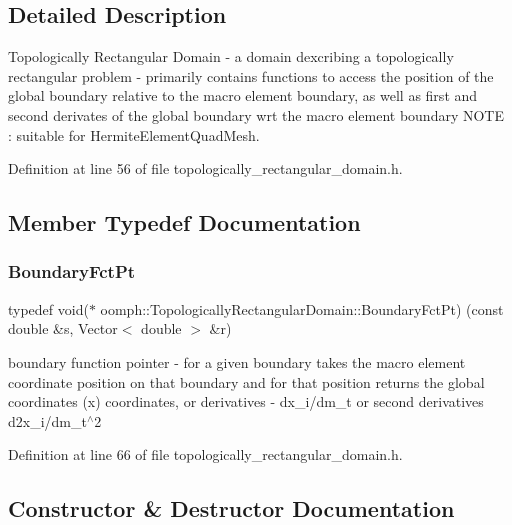 \subsection{Detailed Description}
Topologically Rectangular Domain -\/ a domain dexcribing a topologically rectangular problem -\/ primarily contains functions to access the position of the global boundary relative to the macro element boundary, as well as first and second derivates of the global boundary wrt the macro element boundary N\+O\+TE \+: suitable for Hermite\+Element\+Quad\+Mesh. 

Definition at line 56 of file topologically\+\_\+rectangular\+\_\+domain.\+h.



\subsection{Member Typedef Documentation}
\mbox{\label{classoomph_1_1TopologicallyRectangularDomain_a8b2e24f5500d86c93aef509c5410e7cc}} 
\subsubsection{\texorpdfstring{Boundary\+Fct\+Pt}{BoundaryFctPt}}
{\footnotesize\ttfamily typedef void($\ast$ oomph\+::\+Topologically\+Rectangular\+Domain\+::\+Boundary\+Fct\+Pt) (const double \&s, Vector$<$ double $>$ \&r)}



boundary function pointer -\/ for a given boundary takes the macro element coordinate position on that boundary and for that position returns the global coordinates (x) coordinates, or derivatives -\/ dx\+\_\+i/dm\+\_\+t or second derivatives d2x\+\_\+i/dm\+\_\+t$^\wedge$2 



Definition at line 66 of file topologically\+\_\+rectangular\+\_\+domain.\+h.



\subsection{Constructor \& Destructor Documentation}
\mbox{\label{classoomph_1_1TopologicallyRectangularDomain_acd15ad13385a5077c83f73008638f4fe}} 
